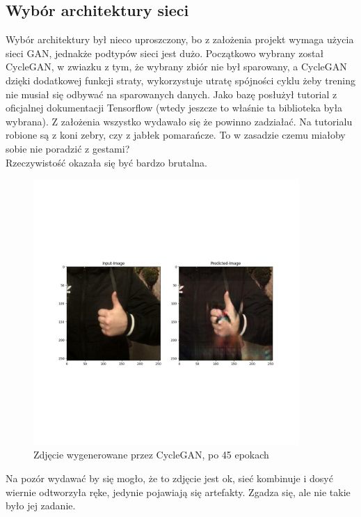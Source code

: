 \documentclass[12pt]{article}
\begin{document}
\begin{sloppypar}
{  \subsection{Wybór architektury sieci} \label{architektura}
  {
    Wybór architektury był nieco uproszczony, bo z założenia projekt wymaga użycia sieci GAN, jednakże podtypów sieci jest dużo.
    Początkowo wybrany został CycleGAN, w zwiazku z tym, że wybrany zbiór nie był sparowany, a CycleGAN dzięki dodatkowej funkcji straty, wykorzystuje 
    utratę spójności cyklu żeby trening nie musiał się odbywać na sparowanych danych. 
    Jako bazę posłużył tutorial z oficjalnej dokumentacji Tensorflow \cite{cyclegan-tf} (wtedy jeszcze to właśnie ta biblioteka była wybrana).
    Z założenia wszystko wydawało się że powinno zadziałać. Na tutorialu robione są z koni zebry, czy z jabłek pomarańcze. 
    To w zasadzie czemu miałoby sobie nie poradzić z gestami?\\
    Rzeczywistość okazała się być bardzo brutalna.
    \begin{figure}[H]
      \centering
      \includegraphics[width=0.9\textwidth]{cycle-gan-45.jpg}
      \caption{Zdjęcie wygenerowane przez CycleGAN, po 45 epokach \cite{cyclegan-tf}}
      \label{fig:cycle-gan-przyklad}
    \end{figure}
    Na pozór wydawać by się mogło, że to zdjęcie jest ok, sieć kombinuje i dosyć wiernie odtworzyła ręke, jedynie pojawiają się artefakty.
    Zgadza się, ale nie takie było jej zadanie. 
}}
\end{sloppypar}
\end{document}
